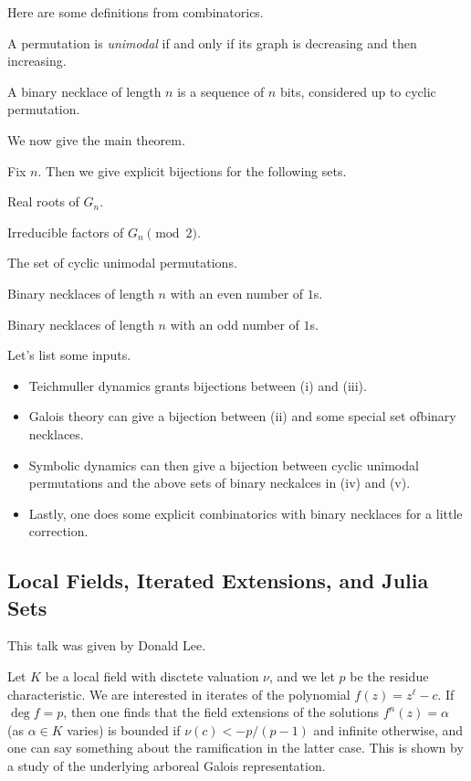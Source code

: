 \documentclass{article}
\begin{document}
Here are some definitions from combinatorics.
\begin{definition}
	A permutation is \textit{unimodal} if and only if its graph is decreasing and then increasing.
\end{definition}
\begin{definition}
	A binary necklace of length $n$ is a sequence of $n$ bits, considered up to cyclic permutation.
\end{definition}
We now give the main theorem.
\begin{theorem}
	Fix $n$. Then we give explicit bijections for the following sets.
	\begin{listroman}
		\item Real roots of $G_n$.
		\item Irreducible factors of $G_n\pmod2$.
		\item The set of cyclic unimodal permutations.
		\item Binary necklaces of length $n$ with an even number of $1$s.
		\item Binary necklaces of length $n$ with an odd number of $1$s.
	\end{listroman}
\end{theorem}
Let's list some inputs.
\begin{itemize}
	\item Teichmuller dynamics grants bijections between (i) and (iii).
	\item Galois theory can give a bijection between (ii) and some special set ofbinary necklaces.
	\item Symbolic dynamics can then give a bijection between cyclic unimodal permutations and the above sets of binary neckalces in (iv) and (v).
	\item Lastly, one does some explicit combinatorics with binary necklaces for a little correction.
\end{itemize}

\subsection{Local Fields, Iterated Extensions, and Julia Sets}
This talk was given by Donald Lee.

Let $K$ be a local field with disctete valuation $\nu$, and we let $p$ be the residue characteristic. We are interested in iterates of the polynomial $f(z)=z^\ell-c$. If $\deg f=p$, then one finds that the field extensions of the solutions $f^n(z)=\alpha$ (as $\alpha\in K$ varies) is bounded if $\nu(c)<-p/(p-1)$ and infinite otherwise, and one can say something about the ramification in the latter case. This is shown by a study of the underlying arboreal Galois representation.
\end{document}
